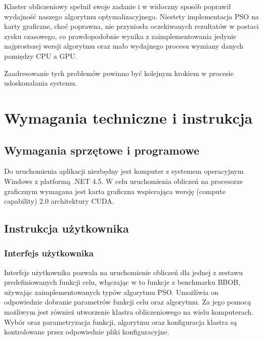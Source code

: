 \documentclass[12pt, twoside, openany, abstract=on]{report}
\theoremstyle{definition}
\begin{document}
Klaster obliczeniowy spełnił swoje zadanie i w widoczny sposób poprawił wydajność naszego algorytmu optymalizacyjnego. Niestety implementacja PSO na karty graficzne, choć poprawna, nie przyniosła oczekiwanych rezultatów w postaci zysku czasowego, co prawdopodobnie wynika z zaimplementowania jedynie najprostszej wersji algorytmu oraz mało wydajnego procesu wymiany danych pomiędzy CPU a GPU. 

Zaadresowanie tych problemów powinno być kolejnym krokiem w procesie udoskonalania systemu. 


\chapter{Wymagania techniczne i instrukcja}

\section{Wymagania sprzętowe i programowe}

Do uruchomienia aplikacji niezbędny jest komputer z systemem operacyjnym Windows z
platformą .NET 4.5. W celu uruchomienia obliczeń na procesorze graficznym wymagana jest karta graficzna wspierająca wersję (compute capability) 2.0 architektury CUDA.

\section{Instrukcja użytkownika}

\subsection{Interfejs użytkownika}
Interfejs użytkownika pozwala na uruchomienie obliczeń dla jednej z zestawu predefiniowanych funkcji celu, włączając w to funkcje z benchmarku BBOB, używając zaimplementowanych typów algorytmu PSO. Umożliwia on odpowiednie dobranie parametrów funkcji celu oraz algorytmu. Za jego pomocą możliwym jest również utworzenie klastra obliczeniowego na wielu komputerach. Wybór oraz parametryzacja funkcji, algorytmu oraz konfiguracja klastra są kontrolowane przez odpowiednie pliki konfiguracyjne. 
\end{document}
